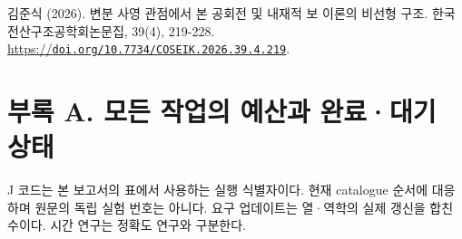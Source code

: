 \documentclass[10pt,a4paper]{article}
\renewcommand{\arraystretch}{1.25}
\begin{document}
{\small\color{muted} 김준식 (2026). 변분 사영 관점에서 본 공회전 및 내재적 보 이론의 비선형 구조. 한국전산구조공학회논문집, 39(4), 219-228. \href{https://doi.org/10.7734/COSEIK.2026.39.4.219}{https://\nolinkurl{doi.org/10.7734/COSEIK.2026.39.4.219}}.\par}

\clearpage

\section{부록 A. 모든 작업의 예산과 완료·대기 상태}

J 코드는 본 보고서의 표에서 사용하는 실행 식별자이다. 현재 catalogue 순서에 대응하며 원문의 독립 실험 번호는 아니다. 요구 업데이트는 열·역학의 실제 갱신을 합친 수이다. 시간 연구는 정확도 연구와 구분한다.\par

\begingroup\fontsize{8}{10.5}\selectfont\renewcommand{\arraystretch}{1.1}
\end{document}
